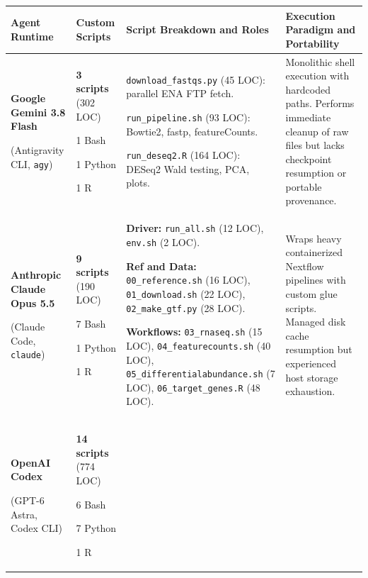 \documentclass[11pt,letterpaper]{article}
\newcommand{\tool}[1]{\textsf{#1}}
\begin{document}
\begin{table}[!htbp]
\centering
\scriptsize
\renewcommand{\arraystretch}{0.92}
\begin{tabularx}{\textwidth}{p{2.8cm}p{2.2cm}XX}
\toprule
\textbf{Agent Runtime} & \textbf{Custom Scripts} & \textbf{Script Breakdown and Roles} & \textbf{Execution Paradigm and Portability} \\
\midrule
\textbf{Google Gemini 3.8 Flash} \par (Antigravity CLI, \texttt{agy}) & \textbf{3 scripts} (302 LOC) \par\vspace{0.2em} 1 Bash \par 1 Python \par 1 R &
\texttt{download\_fastqs.py} (45 LOC): parallel ENA FTP fetch. \par
\texttt{run\_pipeline.sh} (93 LOC): \tool{Bowtie2}, \tool{fastp}, \tool{featureCounts}. \par
\texttt{run\_deseq2.R} (164 LOC): \tool{DESeq2} Wald testing, PCA, plots. &
Monolithic shell execution with hardcoded paths. Performs immediate cleanup of raw files but lacks checkpoint resumption or portable provenance. \\
\addlinespace
\textbf{Anthropic Claude Opus 5.5} \par (Claude Code, \texttt{claude}) & \textbf{9 scripts} (190 LOC) \par\vspace{0.2em} 7 Bash \par 1 Python \par 1 R &
\textbf{Driver:} \texttt{run\_all.sh} (12 LOC), \texttt{env.sh} (2 LOC). \par
\textbf{Ref and Data:} \texttt{00\_reference.sh} (16 LOC), \texttt{01\_download.sh} (22 LOC), \texttt{02\_make\_gtf.py} (28 LOC). \par
\textbf{Workflows:} \texttt{03\_rnaseq.sh} (15 LOC), \texttt{04\_featurecounts.sh} (40 LOC), \texttt{05\_differentialabundance.sh} (7 LOC), \texttt{06\_target\_genes.R} (48 LOC). &
Wraps heavy containerized \tool{Nextflow} pipelines with custom glue scripts. Managed disk cache resumption but experienced host storage exhaustion. \\
\addlinespace
\textbf{OpenAI Codex} \par (GPT-6 Astra, Codex CLI) & \textbf{14 scripts} (774 LOC) \par\vspace{0.2em} 6 Bash \par 7 Python \par 1 R &

\end{tabularx}
\end{table}
\end{document}

